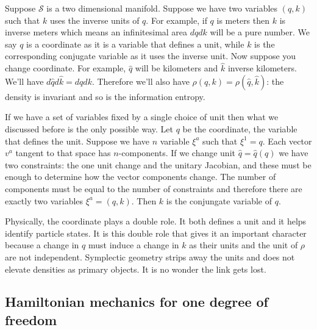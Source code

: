 \documentclass[11pt]{article}
\begin{document}
Suppose $\mathcal{S}$ is a two dimensional manifold. Suppose we have two variables $(q,k)$ such that $k$ uses the inverse units of $q$. For example, if $q$ is meters then $k$ is inverse meters which means an infinitesimal area $dq dk$ will be a pure number. We say $q$ is a coordinate as it is a variable that defines a unit, while $k$ is the corresponding conjugate variable as it uses the inverse unit. Now suppose you change coordinate. For example, $\hat{q}$ will be kilometers and $\hat{k}$ inverse kilometers. We'll have $d\hat{q} d\hat{k} = dq dk$. Therefore we'll also have $\rho(q,k) = \rho(\hat{q}, \hat{k})$: the density is invariant and so is the information entropy.

If we have a set of variables fixed by a single choice of unit then what we discussed before is the only possible way. Let $q$ be the coordinate, the variable that defines the unit. Suppose we have $n$ variable $\xi^a$ such that $\xi^1 = q$. Each vector $v^a$ tangent to that space has $n$-components. If we change unit $\hat{q}=\hat{q}(q)$ we have two constraints: the one unit change and the unitary Jacobian, and these must be enough to determine how the vector components change. The number of components must be equal to the number of constraints and therefore there are exactly two variables $\xi^a = (q, k)$. Then $k$ is the conjungate variable of $q$.

Physically, the coordinate plays a double role. It both defines a unit and it helps identify particle states. It is this double role that gives it an important character because a change in $q$ must induce a change in $k$ as their units and the unit of $\rho$ are not independent. Symplectic geometry strips away the units and does not elevate densities as primary objects. It is no wonder the link gets lost.

\subsection*{Hamiltonian mechanics for one degree of freedom}
\end{document}
